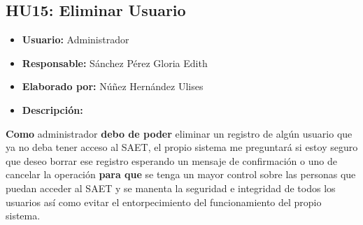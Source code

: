 \subsection{HU15: Eliminar Usuario}
\begin{itemize}
	\item \textbf{Usuario:} Administrador
	\item \textbf{Responsable:} Sánchez Pérez Gloria Edith
	\item \textbf{Elaborado por:} Núñez Hernández Ulises
	\item \textbf{Descripción:}
\end{itemize}
\textbf{Como} administrador \textbf{debo de poder} eliminar un registro de algún usuario que ya no deba tener acceso al SAET, el propio sistema me preguntará si estoy seguro que deseo borrar ese registro esperando un mensaje de confirmación o uno de cancelar la operación \textbf{para que} se tenga un mayor control sobre las personas que puedan acceder al SAET y se manenta la seguridad e integridad de todos los usuarios así como evitar el entorpecimiento del funcionamiento del propio sistema. 